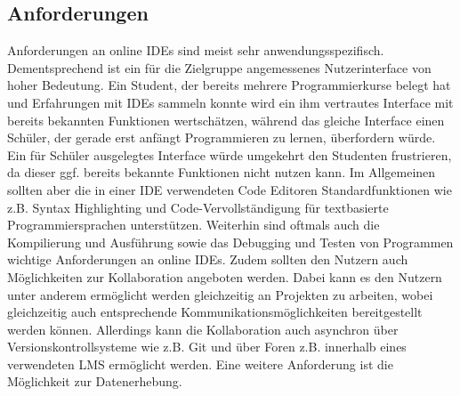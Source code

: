 \subsection{Anforderungen}\label{section:stand-der-technik:literaturrecherche:anforderungen}


Anforderungen an online IDEs sind meist sehr anwendungsspezifisch. Dementsprechend ist ein für die Zielgruppe angemessenes Nutzerinterface von hoher Bedeutung. Ein Student, der bereits mehrere Programmierkurse belegt hat und Erfahrungen mit IDEs sammeln konnte wird ein ihm vertrautes Interface mit bereits bekannten Funktionen wertschätzen, während das gleiche Interface einen Schüler, der gerade erst anfängt Programmieren zu lernen, überfordern würde. Ein für Schüler ausgelegtes Interface würde umgekehrt den Studenten frustrieren, da dieser ggf. bereits bekannte Funktionen nicht nutzen kann. Im Allgemeinen sollten aber die in einer IDE verwendeten Code Editoren Standardfunktionen wie z.B. Syntax Highlighting und Code-Vervollständigung für textbasierte Programmiersprachen unterstützen. Weiterhin sind oftmals auch die Kompilierung und Ausführung sowie das Debugging und Testen von Programmen wichtige Anforderungen an online IDEs. Zudem sollten den Nutzern auch Möglichkeiten zur Kollaboration angeboten werden. Dabei kann es den Nutzern unter anderem ermöglicht werden gleichzeitig an Projekten zu arbeiten, wobei gleichzeitig auch entsprechende Kommunikationsmöglichkeiten bereitgestellt werden können. Allerdings kann die Kollaboration auch asynchron über Versionskontrollsysteme wie z.B. Git  und über Foren z.B. innerhalb eines verwendeten LMS ermöglicht werden. Eine weitere Anforderung ist die Möglichkeit zur Datenerhebung.